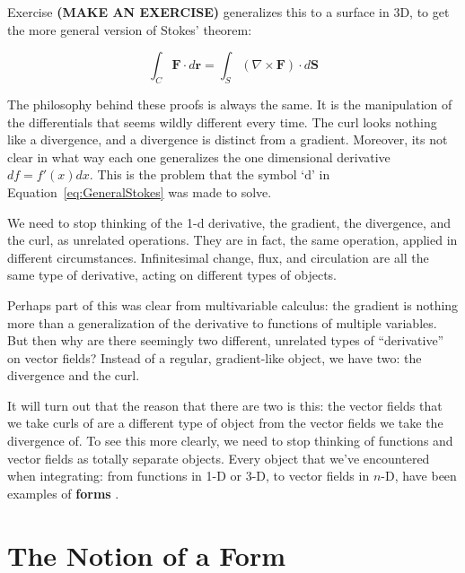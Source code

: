 \documentclass[../master.tex]{subfiles}
\begin{document}
	Exercise \textbf{(MAKE AN EXERCISE)} generalizes this to a surface in 3D, to get the more general version of Stokes' theorem:
	
	\begin{equation}
		\int_C \mathbf{F} \cdot d\mathbf r = \int_S (\nabla \times \mathbf{F}) \cdot d\mathbf S 
	\end{equation}
	
	The philosophy behind these proofs is always the same. It is the manipulation of the differentials that seems wildly different every time. The curl looks nothing like a divergence, and a divergence is distinct from a gradient. Moreover, its not clear in what way each one generalizes the one dimensional derivative $df = f'(x) dx$. This is the problem that the symbol `$\mathrm d$' in Equation~\eqref{eq:GeneralStokes} was made to solve.
	
	We need to stop thinking of the 1-d derivative, the gradient, the divergence, and the curl, as unrelated operations. They are in fact, the same operation, applied in different circumstances. Infinitesimal change, flux, and circulation are all the same type of derivative, acting on different types of objects. 
	
	Perhaps part of this was clear from multivariable calculus: the gradient is nothing more than a generalization of the derivative to functions of multiple variables. But then why are there seemingly two different, unrelated types of ``derivative'' on vector fields? Instead of a regular, gradient-like object, we have two: the divergence and the curl. 
	
	It will turn out that the reason that there are two is this: the vector fields that we take curls of are a different type of object from the vector fields we take the divergence of.	To see this more clearly, we need to stop thinking of functions and vector fields as totally separate objects. Every object that we've encountered when integrating: from functions in 1-D or 3-D, to vector fields in $n$-D, have been examples of \textbf{forms} . 
	
	
	
\section{The Notion of a Form}
\end{document}
